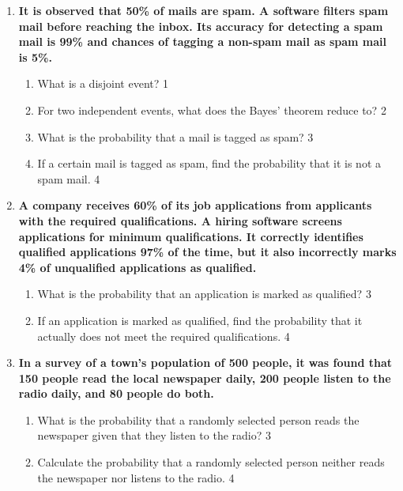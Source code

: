 \documentclass[a4paper,oneside, margin=1.4in]{book}
\begin{document}
\begin{enumerate}
     \item
	  \textbf{It is observed that 50\% of mails are spam. A software 
	  filters spam mail before reaching the inbox. Its accuracy for detecting a spam mail is 99\% and chances of tagging a non-spam mail as spam mail is 5\%.} 
  
  \begin{enumerate}
    \item
	What is a disjoint event? \hfill 1
    \item
	For two independent events, what does the Bayes' theorem reduce to? \hfill 2
    \item  
	What is the probability that a mail is tagged as spam?  \hfill 3
    \item
	If a certain mail is tagged as spam, find the probability that it is not a spam mail. \hfill 4
  \end{enumerate}
  
  \item
  \textbf{A company receives 60\% of its job applications from applicants with
  the required qualifications. A hiring software screens applications for minimum qualifications. It correctly identifies qualified applications 97\% of the time, but it also incorrectly marks 4\% of unqualified applications as qualified.}
  
  \begin{enumerate}
   \item  
    What is the probability that an application is marked as qualified? \hfill 3
   \item
    If an application is marked as qualified, find the probability that it actually does not meet the required qualifications. \hfill 4
  \end{enumerate}

\item
  \textbf{In a survey of a town's population of 500 people, it was found that 150 people read the local newspaper daily, 200 people listen to the radio daily, and 80 people do both.}
 
  \begin{enumerate}
    \item
    	What is the probability that a randomly selected person reads the newspaper given that they listen to the radio? \hfill 3
    \item
    	Calculate the probability that a randomly selected person neither reads the newspaper nor listens to the radio. \hfill 4
  \end{enumerate}


\end{enumerate}
\end{document}
